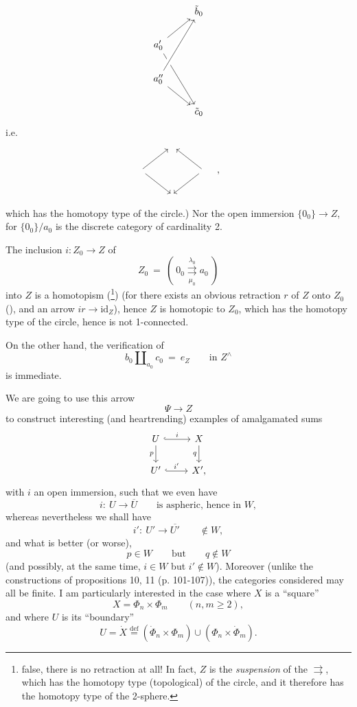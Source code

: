 \documentclass[11pt]{article}
\newcommand{\printedpage}[1]{\marginpar{\footnotesize p.~#1}}
\newcommand{\msp}[1]{\marginpar{\footnotesize [#1]}}
\newcommand{\id}{\mathrm{id}}
\begin{document}
\[
\begin{tikzcd}
& \tilde{b}_0 \\
a'_0 \arrow[ur] \arrow[ddr] & \\
a''_0 \arrow[uur, crossing over] \arrow[dr] & \\
& \tilde{c}_0
\end{tikzcd}
\]
\printedpage{8}
i.e.
\[
\begin{tikzcd}
& {} & \\
{} \arrow[ur] \arrow[dr] & & {} \arrow[ul] \arrow[dl] \\
& {} &
\end{tikzcd}
\quad ,
\]
which has the homotopy type of the circle.) Nor the open immersion $\{0_0\} \longrightarrow Z$, for $\{0_0\}/a_0$ is the discrete category of cardinality 2.

The inclusion $i : Z_0 \longrightarrow Z$ of
\[ Z_0 \ = \ (\ 0_0 \overset{\lambda_0}{\underset{\mu_0}{\rightrightarrows}} a_0\ ) \]
into $Z$ is a homotopism (\footnote[7]{false, there is no retraction at all! In fact, $Z$ is the \textit{suspension} of the $\rightrightarrows$, which has the homotopy type (topological) of the circle, and it therefore has the homotopy type of the 2-sphere.}) (for there exists an obvious retraction $r$ of $Z$ onto $Z_0$ (\footnotemark[7]), and an arrow $ir \longrightarrow \id_Z$), hence $Z$ is homotopic to $Z_0$, which has the homotopy type of the circle, hence is not 1-connected.

\msp{page 12}
On the other hand, the verification of
\[ b_0 \amalg_{a_0} c_0 \ = \ e_Z \qquad \text{in } Z^{\wedge} \]
is immediate.

We are going to use this arrow
\[ \Psi \longrightarrow Z \]
to construct interesting (and heartrending) examples of amalgamated sums
\[
\begin{tikzcd}
U \arrow[r, hook, "i"] \arrow[d, "p"'] & X \arrow[d, "q"'] \\
U' \arrow[r, hook, "i'"] & X',
\end{tikzcd}
\]
with $i$ an open immersion, such that we even have
\[ i :\ U \longrightarrow \overline{U} \qquad \text{is aspheric, hence in } W, \]
whereas nevertheless we shall have
\[ i' :\ U' \longrightarrow \overline{U'} \qquad \notin W, \]
and what is better (or worse),
\[ p \in W \qquad \text{but} \qquad q \notin W \]
\printedpage{9}
(and possibly, at the same time, $i \in W$ but $i' \notin W$). Moreover (unlike the constructions of propositions 10, 11 (p. 101-107)), the categories considered may all be finite. I am particularly interested in the case where $X$ is a ``square''
\[ X = \Phi_n \times \Phi_m \qquad (n,m \geq 2), \]
and where $U$ is its ``boundary''
\[ U = \dot{X} \overset{\text{def}}{=} (\dot{\Phi}_n \times \Phi_m) \cup (\Phi_n \times \dot{\Phi}_m). \]
\end{document}
